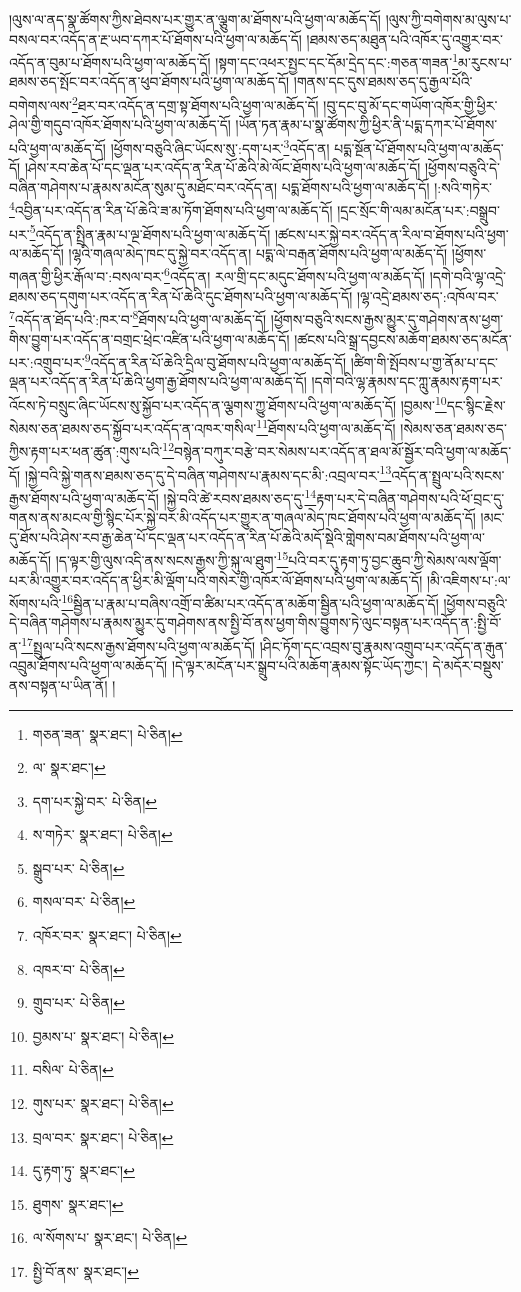 །ལུས་ལ་ནད་སྣ་ཚོགས་ཀྱིས་ཐེབས་པར་གྱུར་ན་ལྕུག་མ་ཐོགས་པའི་ཕྱག་ལ་མཆོད་དོ། །ལུས་ཀྱི་བགེགས་མ་ལུས་པ་བསལ་བར་འདོད་ན་རྔ་ཡབ་དཀར་པོ་ཐོགས་པའི་ཕྱག་ལ་མཆོད་དོ། །ཐམས་ཅད་མཐུན་པའི་འཁོར་དུ་འགྱུར་བར་འདོད་ན་བུམ་པ་ཐོགས་པའི་ཕྱག་ལ་མཆོད་དོ། །སྟག་དང་འཕར་སྤྱང་དང་དོམ་དྲེད་དང་:གཅན་གཟན་\footnote{གཅན་ཟན་  སྣར་ཐང་།  པེ་ཅིན། }མ་རུངས་པ་ཐམས་ཅད་སྤོང་བར་འདོད་ན་ཕུབ་ཐོགས་པའི་ཕྱག་ལ་མཆོད་དོ། །གནས་དང་དུས་ཐམས་ཅད་དུ་རྒྱལ་པོའི་བགེགས་ལས་\footnote{ལ་  སྣར་ཐང་། }ཐར་བར་འདོད་ན་དགྲ་སྟ་ཐོགས་པའི་ཕྱག་ལ་མཆོད་དོ། །བུ་དང་བུ་མོ་དང་གཡོག་འཁོར་གྱི་ཕྱིར་ཤེལ་གྱི་གདུབ་འཁོར་ཐོགས་པའི་ཕྱག་ལ་མཆོད་དོ། །ཡོན་ཏན་རྣམ་པ་སྣ་ཚོགས་ཀྱི་ཕྱིར་ནི་པདྨ་དཀར་པོ་ཐོགས་པའི་ཕྱག་ལ་མཆོད་དོ། །ཕྱོགས་བཅུའི་ཞིང་ཡོངས་སུ་:དག་པར་\footnote{དག་པར་སྐྱེ་བར་  པེ་ཅིན། }འདོད་ན། པདྨ་སྔོན་པོ་ཐོགས་པའི་ཕྱག་ལ་མཆོད་དོ། །ཤེས་རབ་ཆེན་པོ་དང་ལྡན་པར་འདོད་ན་རིན་པོ་ཆེའི་མེ་ལོང་ཐོགས་པའི་ཕྱག་ལ་མཆོད་དོ། །ཕྱོགས་བཅུའི་དེ་བཞིན་གཤེགས་པ་རྣམས་མངོན་སུམ་དུ་མཐོང་བར་འདོད་ན། པདྨ་ཐོགས་པའི་ཕྱག་ལ་མཆོད་དོ། །:སའི་གཏེར་\footnote{ས་གཏེར་  སྣར་ཐང་།  པེ་ཅིན། }འབྱིན་པར་འདོད་ན་རིན་པོ་ཆེའི་ཟ་མ་ཏོག་ཐོགས་པའི་ཕྱག་ལ་མཆོད་དོ། །དྲང་སྲོང་གི་ལམ་མངོན་པར་:བསྒྲུབ་པར་\footnote{སྒྲུབ་པར་  པེ་ཅིན། }འདོད་ན་སྤྲིན་རྣམ་པ་ལྔ་ཐོགས་པའི་ཕྱག་ལ་མཆོད་དོ། །ཚངས་པར་སྐྱེ་བར་འདོད་ན་རིལ་བ་ཐོགས་པའི་ཕྱག་ལ་མཆོད་དོ། །ལྷའི་གཞལ་མེད་ཁང་དུ་སྐྱེ་བར་འདོད་ན། པདྨ་ལེ་བརྒན་ཐོགས་པའི་ཕྱག་ལ་མཆོད་དོ། །ཕྱོགས་གཞན་གྱི་ཕྱིར་རྒོལ་བ་:བསལ་བར་\footnote{གསལ་བར་  པེ་ཅིན། }འདོད་ན། རལ་གྲི་དང་མདུང་ཐོགས་པའི་ཕྱག་ལ་མཆོད་དོ། །དགེ་བའི་ལྷ་འདྲེ་ཐམས་ཅད་དགུག་པར་འདོད་ན་རིན་པོ་ཆེའི་དུང་ཐོགས་པའི་ཕྱག་ལ་མཆོད་དོ། །ལྷ་འདྲེ་ཐམས་ཅད་:འཁོལ་བར་\footnote{འཁོར་བར་  སྣར་ཐང་།  པེ་ཅིན། }འདོད་ན་ཐོད་པའི་:ཁར་བ་\footnote{འཁར་བ་  པེ་ཅིན། }ཐོགས་པའི་ཕྱག་ལ་མཆོད་དོ། །ཕྱོགས་བཅུའི་སངས་རྒྱས་མྱུར་དུ་གཤེགས་ནས་ཕྱག་གིས་བྱུག་པར་འདོད་ན་བགྲང་ཕྲེང་འཛིན་པའི་ཕྱག་ལ་མཆོད་དོ། །ཚངས་པའི་སྒྲ་དབྱངས་མཆོག་ཐམས་ཅད་མངོན་པར་:འགྲུབ་པར་\footnote{གྲུབ་པར་  པེ་ཅིན། }འདོད་ན་རིན་པོ་ཆེའི་དྲིལ་བུ་ཐོགས་པའི་ཕྱག་ལ་མཆོད་དོ། །ཚིག་གི་སྤོབས་པ་གྱ་ནོམ་པ་དང་ལྡན་པར་འདོད་ན་རིན་པོ་ཆེའི་ཕྱག་རྒྱ་ཐོགས་པའི་ཕྱག་ལ་མཆོད་དོ། །དགེ་བའི་ལྷ་རྣམས་དང་ཀླུ་རྣམས་རྟག་པར་འོངས་ཏེ་བསྲུང་ཞིང་ཡོངས་སུ་སྐྱོབ་པར་འདོད་ན་ལྕགས་ཀྱུ་ཐོགས་པའི་ཕྱག་ལ་མཆོད་དོ། །བྱམས་\footnote{བྱམས་པ་  སྣར་ཐང་།  པེ་ཅིན། }དང་སྙིང་རྗེས་སེམས་ཅན་ཐམས་ཅད་སྐྱོབ་པར་འདོད་ན་འཁར་གསིལ་\footnote{བསིལ་  པེ་ཅིན། }ཐོགས་པའི་ཕྱག་ལ་མཆོད་དོ། །སེམས་ཅན་ཐམས་ཅད་ཀྱིས་རྟག་པར་ཕན་ཚུན་:གུས་པའི་\footnote{གུས་པར་  སྣར་ཐང་།  པེ་ཅིན། }བསྙེན་བཀུར་བརྩེ་བར་སེམས་པར་འདོད་ན་ཐལ་མོ་སྦྱོར་བའི་ཕྱག་ལ་མཆོད་དོ། །སྐྱེ་བའི་སྐྱེ་གནས་ཐམས་ཅད་དུ་དེ་བཞིན་གཤེགས་པ་རྣམས་དང་མི་:འབྲལ་བར་\footnote{བྲལ་བར་  སྣར་ཐང་།  པེ་ཅིན། }འདོད་ན་སྤྲུལ་པའི་སངས་རྒྱས་ཐོགས་པའི་ཕྱག་ལ་མཆོད་དོ། །སྐྱེ་བའི་ཚེ་རབས་ཐམས་ཅད་དུ་\footnote{དུ་རྟག་ཏུ་  སྣར་ཐང་། }རྟག་པར་དེ་བཞིན་གཤེགས་པའི་ཕོ་བྲང་དུ་གནས་ནས་མངལ་གྱི་སྙིང་པོར་སྐྱེ་བར་མི་འདོད་པར་གྱུར་ན་གཞལ་མེད་ཁང་ཐོགས་པའི་ཕྱག་ལ་མཆོད་དོ། །མང་དུ་ཐོས་པའི་ཤེས་རབ་རྒྱ་ཆེན་པོ་དང་ལྡན་པར་འདོད་ན་རིན་པོ་ཆེའི་མདོ་སྡེའི་གླེགས་བམ་ཐོགས་པའི་ཕྱག་ལ་མཆོད་དོ། །ད་ལྟར་གྱི་ལུས་འདི་ནས་སངས་རྒྱས་ཀྱི་སྐུ་ལ་ཐུག་\footnote{ཐུགས་  སྣར་ཐང་། }པའི་བར་དུ་རྟག་ཏུ་བྱང་ཆུབ་ཀྱི་སེམས་ལས་ལྡོག་པར་མི་འགྱུར་བར་འདོད་ན་ཕྱིར་མི་ལྡོག་པའི་གསེར་གྱི་འཁོར་ལོ་ཐོགས་པའི་ཕྱག་ལ་མཆོད་དོ། །མི་འཇིགས་པ་:ལ་སོགས་པའི་\footnote{ལ་སོགས་པ་  སྣར་ཐང་།  པེ་ཅིན། }སྦྱིན་པ་རྣམ་པ་བཞིས་འགྲོ་བ་ཚིམ་པར་འདོད་ན་མཆོག་སྦྱིན་པའི་ཕྱག་ལ་མཆོད་དོ། །ཕྱོགས་བཅུའི་དེ་བཞིན་གཤེགས་པ་རྣམས་མྱུར་དུ་གཤེགས་ནས་སྤྱི་བོ་ནས་ཕྱག་གིས་བྱུགས་ཏེ་ལུང་བསྟན་པར་འདོད་ན་:སྤྱི་བོ་ན་\footnote{སྤྱི་བོ་ནས་  སྣར་ཐང་། }སྤྲུལ་པའི་སངས་རྒྱས་ཐོགས་པའི་ཕྱག་ལ་མཆོད་དོ། །ཤིང་ཏོག་དང་འབྲས་བུ་རྣམས་འགྲུབ་པར་འདོད་ན་རྒུན་འབྲུམ་ཐོགས་པའི་ཕྱག་ལ་མཆོད་དོ། །དེ་ལྟར་མངོན་པར་སྒྲུབ་པའི་མཆོག་རྣམས་སྟོང་ཡོད་ཀྱང་། དེ་མདོར་བསྡུས་ནས་བསྟན་པ་ཡིན་ནོ། །
